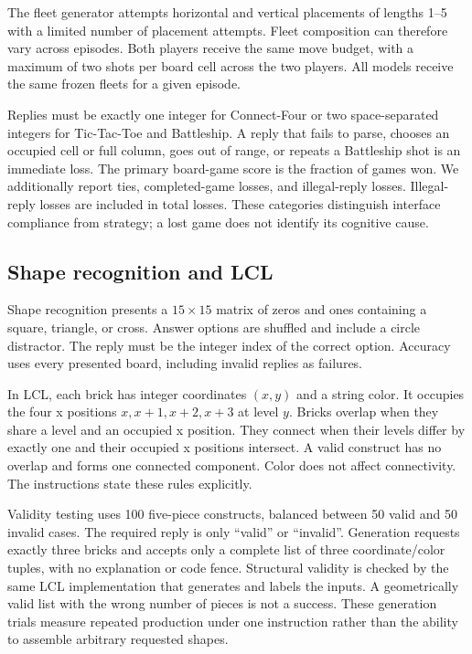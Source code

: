 \documentclass[12pt,letterpaper]{article}
\begin{document}
The fleet generator attempts horizontal and vertical placements of lengths 1--5 with a limited number of placement attempts. Fleet composition can therefore vary across episodes. Both players receive the same move budget, with a maximum of two shots per board cell across the two players. All models receive the same frozen fleets for a given episode.

Replies must be exactly one integer for Connect-Four or two space-separated integers for Tic-Tac-Toe and Battleship. A reply that fails to parse, chooses an occupied cell or full column, goes out of range, or repeats a Battleship shot is an immediate loss. The primary board-game score is the fraction of games won. We additionally report ties, completed-game losses, and illegal-reply losses. Illegal-reply losses are included in total losses. These categories distinguish interface compliance from strategy; a lost game does not identify its cognitive cause.

\subsection*{Shape recognition and LCL}
Shape recognition presents a $15\times15$ matrix of zeros and ones containing a square, triangle, or cross. Answer options are shuffled and include a circle distractor. The reply must be the integer index of the correct option. Accuracy uses every presented board, including invalid replies as failures.

In LCL, each brick has integer coordinates $(x,y)$ and a string color. It occupies the four x positions $x,x+1,x+2,x+3$ at level $y$. Bricks overlap when they share a level and an occupied x position. They connect when their levels differ by exactly one and their occupied x positions intersect. A valid construct has no overlap and forms one connected component. Color does not affect connectivity. The instructions state these rules explicitly.

Validity testing uses 100 five-piece constructs, balanced between 50 valid and 50 invalid cases. The required reply is only ``valid'' or ``invalid''. Generation requests exactly three bricks and accepts only a complete list of three coordinate/color tuples, with no explanation or code fence. Structural validity is checked by the same LCL implementation that generates and labels the inputs. A geometrically valid list with the wrong number of pieces is not a success. These generation trials measure repeated production under one instruction rather than the ability to assemble arbitrary requested shapes.
\end{document}

